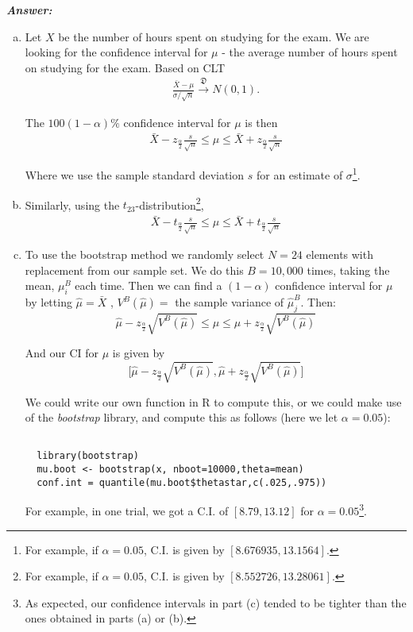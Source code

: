 \documentclass[12pt]{article}
\begin{document}
  \textbf{\color{TealBlue}\emph{Answer:} } 
\bigskip
\begin{enumerate}[(a)]
\item Let $X$ be the number of hours spent on studying for the exam. We are looking for the confidence interval for $\mu$ - the average number of hours spent on studying for the exam.  Based on CLT
\begin{align*}
\frac{\bar X - \mu} {\sigma / \sqrt n}   \xrightarrow{\mathfrak{D}}  N(0, 1).
\end{align*}

The  $100(1 - \alpha)\%$ confidence interval for $\mu$ is then
\begin{align*}
\bar X - z_{\frac{\alpha}{2}} \frac{s}{\sqrt n}  \leq \mu \leq \bar X + z_{\frac{\alpha}{2}} \frac{s}{\sqrt n} 
\end{align*}

Where we use the sample standard deviation $s$ for an estimate of $\sigma$\footnote{
For example, if $\alpha = 0.05$, C.I. is given by $\left[8.676935 , 13.1564\right]$.
}. 


\item Similarly, using the $t_{23}$-distribution\footnote{For example, if $\alpha = 0.05$, C.I. is given by $\left[8.552726 , 13.28061\right]$. },
\begin{align*}
\bar X - t_{\frac{\alpha}{2}} \frac{s}{\sqrt n}  \leq \mu \leq \bar X + t_{\frac{\alpha}{2}} \frac{s}{\sqrt n} 
\end{align*}

\item To use the bootstrap method we randomly select $N = 24$ elements with replacement from our sample set. We do this $B = 10,000$ times, taking the mean, $\mu_i^B$ each time. Then we can find a $(1-\alpha)$ confidence interval for $\mu$ by letting $\hat \mu = \bar X$ ,  $V^B(\hat \mu ) = $ the sample variance of $\hat{\mu}_j^B$. Then:
$$\hat \mu - z_{\frac{\alpha}{2}}\sqrt{V^B(\hat \mu)} \leq \mu \leq  \hat \mu + z_{\frac{\alpha}{2}}\sqrt{V^B(\hat \mu)}$$

And our CI for $\mu$ is given by 
$$\Big[ \hat \mu - z_{\frac{\alpha}{2}}\sqrt{V^B(\hat \mu)} ,  \hat \mu + z_{\frac{\alpha}{2}}\sqrt{V^B(\hat \mu)}\Big]$$

We could write our own function in R to compute this, or we could make use of the \textit{bootstrap} library, and compute this as follows (here we let $\alpha = 0.05$):

\begin{lstlisting}

  library(bootstrap)
  mu.boot <- bootstrap(x, nboot=10000,theta=mean)
  conf.int = quantile(mu.boot$thetastar,c(.025,.975))

\end{lstlisting}

For example, in one trial, we got a C.I. of $\left[8.79, 13.12\right]$ for $\alpha = 0.05$\footnote{As expected, our confidence intervals in part (c) tended to be tighter than the ones obtained in parts (a) or (b).}.
\end{enumerate}
\end{document}
